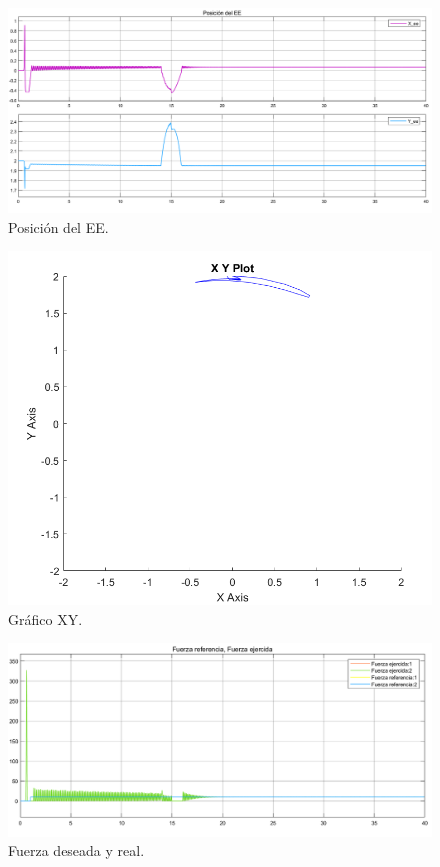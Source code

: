 \begin{figure}[H]
	\centering
	\includegraphics[width=0.8\linewidth]{ImagenesControl de fuerza no lineal/2_3_f_b}
	\caption{Posici\'on del EE.}	
	\label{fig:aposd}
\end{figure}
\begin{figure}[H]
	\centering
	\includegraphics[width=0.5\linewidth]{ImagenesControl de fuerza no lineal/2_3_f_c}
	\caption{Gr\'afico XY.}	
	\label{fig:bxyd}
\end{figure}
\begin{figure}[H]
	\centering
	\includegraphics[width=0.8\linewidth]{ImagenesControl de fuerza no lineal/2_3_f_e}
	\caption{Fuerza deseada y real.}	
	\label{fig:bfd}
\end{figure}
%
